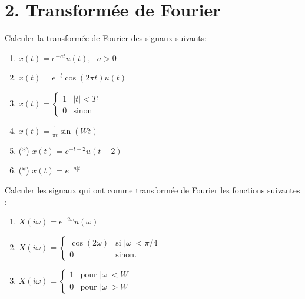 \section*{2. Transformée de Fourier}

\begin{exercise}
    Calculer la transformée de Fourier des signaux suivants:
    \begin{enumerate}[label=(\alph*)]
        \item $x(t) = e^{-at}u(t)$, \ $a>0$
        \item $x(t) = e^{-t}\cos(2\pi t)u(t)$
        \item $x(t) = 
            \begin{cases}
            1 & |t| < T_1 \\
            0 & \text{sinon}
            \end{cases}
        $
        \item $x(t) = \frac{1}{\pi t}\sin(Wt)$ 
        
        \item (*) $x(t) = e^{-t+2}u(t-2)$
        \item (*) $x(t) = e^{-a|t|}$
        
    \end{enumerate}
\end{exercise}

\begin{exercise}
    Calculer les signaux qui ont comme transformée de Fourier les fonctions suivantes :
    \begin{enumerate}[label=(\alph*)]
        \item $X(i\omega) = e^{-2\omega}u(\omega)$
        \item $X(i\omega) = 
            \begin{cases}
                \cos(2\omega) & \text{si } |\omega| < \pi/4 \\
                0 & \text{sinon}.
            \end{cases}$
	\item $X(i\omega) = 
	    \begin{cases}
            1 & \text{pour } |\omega| < W \\
            0 & \text{pour } |\omega| > W
        \end{cases}$
    \end{enumerate}
\end{exercise}

